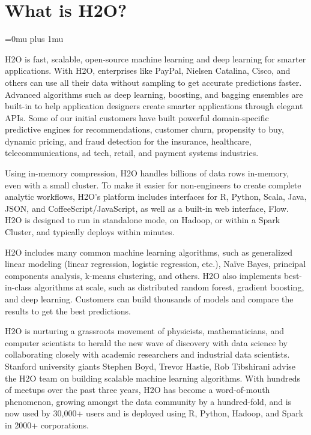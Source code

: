 \section{What is H2O?}
\Urlmuskip=0mu plus 1mu\relax %


H2O is fast, scalable, open-source machine learning and deep learning for smarter applications. With H2O, enterprises like PayPal, Nielsen Catalina, Cisco, and others can use all their data without sampling to get accurate predictions faster. Advanced algorithms such as deep learning, boosting, and bagging ensembles are built-in to help application designers create smarter applications through elegant APIs. Some of our initial customers have built powerful domain-specific predictive engines for recommendations, customer churn, propensity to buy, dynamic pricing, and fraud detection for the insurance, healthcare, telecommunications, ad tech, retail, and payment systems industries.

Using in-memory compression, H2O handles billions of data rows in-memory, even with a small cluster. To make it easier for non-engineers to create complete analytic workflows, H2O's platform includes interfaces for R, Python, Scala, Java, JSON, and CoffeeScript/JavaScript, as well as a built-in  web interface, Flow. H2O is designed to run in standalone mode, on Hadoop, or within a Spark Cluster, and typically deploys within minutes.

H2O includes many common machine learning algorithms, such as generalized linear modeling (linear regression, logistic regression, etc.), Na\"{i}ve Bayes, principal components analysis, k-means clustering, and others. H2O also implements best-in-class algorithms at scale, such as distributed random forest, gradient boosting, and deep learning. Customers can build thousands of models and compare the results to get the best predictions.

H2O is nurturing a grassroots movement of physicists, mathematicians, and computer scientists to herald the new wave of discovery with data science by collaborating closely with academic researchers and industrial data scientists. Stanford university giants Stephen Boyd, Trevor Hastie, Rob Tibshirani advise the H2O team on building scalable machine learning algorithms. With hundreds of meetups over the past three years, H2O has become a word-of-mouth phenomenon, growing amongst the data community by a hundred-fold, and is now used by 30,000+ users and is deployed using R, Python, Hadoop, and Spark in 2000+ corporations.

